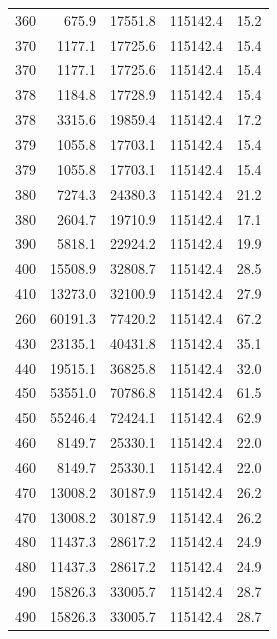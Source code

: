 \begin{longtable}{rrrrr}
    360 & \num{675.9} & \num{17551.8} & \num{115142.4} & 15.2 \\
    370 & \num{1177.1} & \num{17725.6} & \num{115142.4} & 15.4 \\
    370 & \num{1177.1} & \num{17725.6} & \num{115142.4} & 15.4 \\
    378 & \num{1184.8} & \num{17728.9} & \num{115142.4} & 15.4 \\
    378 & \num{3315.6} & \num{19859.4} & \num{115142.4} & 17.2 \\
    379 & \num{1055.8} & \num{17703.1} & \num{115142.4} & 15.4 \\
    379 & \num{1055.8} & \num{17703.1} & \num{115142.4} & 15.4 \\
    380 & \num{7274.3} & \num{24380.3} & \num{115142.4} & 21.2 \\
    380 & \num{2604.7} & \num{19710.9} & \num{115142.4} & 17.1 \\
    390 & \num{5818.1} & \num{22924.2} & \num{115142.4} & 19.9 \\
    400 & \num{15508.9} & \num{32808.7} & \num{115142.4} & 28.5 \\
    410 & \num{13273.0} & \num{32100.9} & \num{115142.4} & 27.9 \\
    260 & \num{60191.3} & \num{77420.2} & \num{115142.4} & 67.2 \\
    430 & \num{23135.1} & \num{40431.8} & \num{115142.4} & 35.1 \\
    440 & \num{19515.1} & \num{36825.8} & \num{115142.4} & 32.0 \\
    450 & \num{53551.0} & \num{70786.8} & \num{115142.4} & 61.5 \\
    450 & \num{55246.4} & \num{72424.1} & \num{115142.4} & 62.9 \\
    460 & \num{8149.7} & \num{25330.1} & \num{115142.4} & 22.0 \\
    460 & \num{8149.7} & \num{25330.1} & \num{115142.4} & 22.0 \\
    470 & \num{13008.2} & \num{30187.9} & \num{115142.4} & 26.2 \\
    470 & \num{13008.2} & \num{30187.9} & \num{115142.4} & 26.2 \\
    480 & \num{11437.3} & \num{28617.2} & \num{115142.4} & 24.9 \\
    480 & \num{11437.3} & \num{28617.2} & \num{115142.4} & 24.9 \\
    490 & \num{15826.3} & \num{33005.7} & \num{115142.4} & 28.7 \\
    490 & \num{15826.3} & \num{33005.7} & \num{115142.4} & 28.7 \\

\end{longtable}
